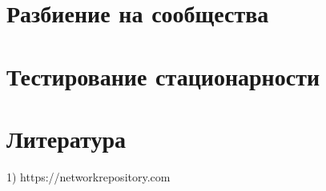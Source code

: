 \documentclass[reprint, amsmath, amssymb, aps,]{revtex4-2}
\begin{document}
\section{Разбиение на сообщества}






\section{Тестирование стационарности}





\section{Литература}
1) https://networkrepository.com
\end{document}

